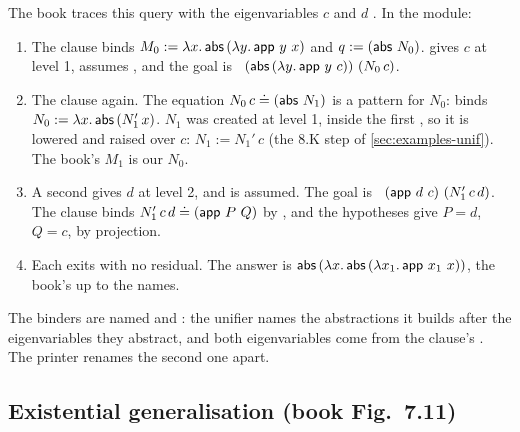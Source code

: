 \begin{tutorial}
The book traces this query with the eigenvariables $c$ and $d$ . In the module:
\begin{enumerate}
  \item The  clause binds $M_0:=\abs{x}{\cst{abs}\,(\abs{y}{\cst{app}\ y\ x})}$ and
    $q:=(\mathsf{abs}\ N_0)$.  gives $c$ at level 1,  assumes
    , and the goal is ~$(\cst{abs}\,(\abs{y}{\cst{app}\ y\ c}))\ (N_0\,c)$.
  \item The  clause again. The equation $N_0\,c\doteq(\mathsf{abs}\ N_1)$ is a pattern for $N_0$:
     binds $N_0:=\lambda x.\,\mathsf{abs}\,(N_1'\,x)$. $N_1$ was created at level 1, inside the
    first , so it is lowered and raised over $c$: $N_1:=N_1'\,c$ (the 8.K step of
    \cref{sec:examples-unif}). The book's $M_1$ is our $N_0$.
  \item A second  gives $d$ at level 2, and  is assumed. The goal is
    ~$(\mathsf{app}\ d\ c)\ (N_1'\,c\,d)$. The  clause binds
    $N_1'\,c\,d\doteq(\cst{app}\ P\ Q)$ by , and the hypotheses give $P=d$, $Q=c$, by
    projection.
  \item Each  exits with no residual. The answer is
    $\cst{abs}\,(\abs{x}{\cst{abs}\,(\abs{x_1}{\cst{app}\ x_1\ x})})$, the book's
     up to the names.
\end{enumerate}
The binders are named  and : the unifier names the abstractions it builds after the
eigenvariables they abstract, and both eigenvariables come from the clause's . The
printer renames the second one apart.
\end{tutorial}

\subsection{Existential generalisation (book Fig.~7.11)}

